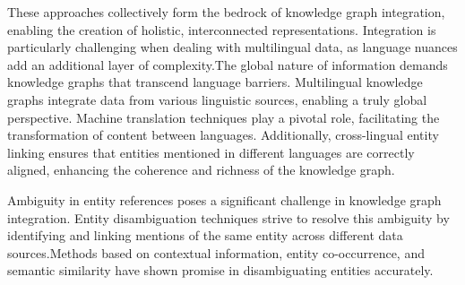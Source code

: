 These approaches collectively form the bedrock of knowledge graph integration, enabling the creation of holistic, interconnected representations. Integration is particularly challenging when dealing with multilingual data, as language nuances add an additional layer of complexity.The global nature of information demands knowledge graphs that transcend language barriers. Multilingual knowledge graphs integrate data from various linguistic sources, enabling a truly global perspective. Machine translation techniques play a pivotal role, facilitating the transformation of content between languages. Additionally, cross-lingual entity linking ensures that entities mentioned in different languages are correctly aligned, enhancing the coherence and richness of the knowledge graph.

Ambiguity in entity references poses a significant challenge in knowledge graph integration. Entity disambiguation techniques strive to resolve this ambiguity by identifying and linking mentions of the same entity across different data sources.Methods based on contextual information, entity co-occurrence, and semantic similarity have shown promise in disambiguating entities accurately.




